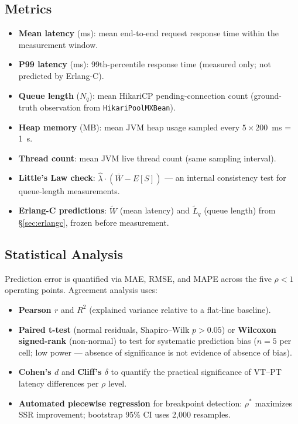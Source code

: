 \documentclass[10pt]{article}
\begin{document}
\subsection{Metrics}

\begin{itemize}
\item \textbf{Mean latency} (ms): mean end-to-end request response time within the measurement window.
\item \textbf{P99 latency} (ms): 99th-percentile response time (measured only; not predicted by Erlang-C).
\item \textbf{Queue length} ($N_q$): mean HikariCP pending-connection count (ground-truth observation from \texttt{HikariPoolMXBean}).
\item \textbf{Heap memory} (MB): mean JVM heap usage sampled every $5 \times 200$~ms = 1~s.
\item \textbf{Thread count}: mean JVM live thread count (same sampling interval).
\item \textbf{Little's Law check}: $\hat\lambda\cdot(\bar W - E[S])$ --- an internal consistency test for queue-length measurements.
\item \textbf{Erlang-C predictions}: $\widetilde{W}$ (mean latency) and $\widetilde{L}_q$ (queue length) from \S\ref{sec:erlangc}, frozen before measurement.
\end{itemize}

\subsection{Statistical Analysis}

Prediction error is quantified via MAE, RMSE, and MAPE across the five $\rho < 1$ operating points. Agreement analysis uses:
\begin{itemize}
\item \textbf{Pearson $r$} and $R^2$ (explained variance relative to a flat-line baseline).
\item \textbf{Paired t-test} (normal residuals, Shapiro--Wilk $p > 0.05$) or \textbf{Wilcoxon signed-rank} (non-normal) to test for systematic prediction bias ($n=5$ per cell; low power --- absence of significance is not evidence of absence of bias).
\item \textbf{Cohen's $d$} and \textbf{Cliff's $\delta$} to quantify the practical significance of VT--PT latency differences per $\rho$ level.
\item \textbf{Automated piecewise regression} for breakpoint detection: $\rho^*$ maximizes SSR improvement; bootstrap 95\% CI uses 2{,}000 resamples.
\end{itemize}
\end{document}
